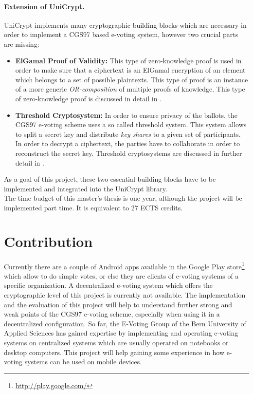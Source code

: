 \documentclass[numbers=noenddot, abstract=on, a4paper, headsepline,
footsepline, oneside, draft=off]{scrreprt}
\begin{document}
\paragraph{Extension of UniCrypt.}
UniCrypt implements many cryptographic building blocks which are necessary in
order to implement a CGS97 based e-voting system, however two crucial parts are
missing:
\begin{itemize}
  \item \textbf{ElGamal Proof of Validity:} This type of zero-knowledge proof is
  used in order to make sure that a ciphertext is an ElGamal encryption of an
  element which belongs to a set of possible plaintexts. This type of proof is
  an instance	 of a more generic \emph{OR-composition} of multiple proofs of
  knowledge. This type of zero-knowledge proof is discussed in detail in
  .
  \item \textbf{Threshold Cryptosystem:} In order to ensure privacy of
  the ballots, the CGS97 e-voting scheme uses a so called threshold system. This
  system allows to split a secret key and distribute \emph{key shares} to a
  given set of participants. In order to decrypt a ciphertext, the parties have
  to collaborate in order to reconstruct the secret key. Threshold cryptosystems
  are discussed in further detail in .
\end{itemize}

As a goal of this project, these two essential building blocks have to be
implemented and integrated into the UniCrypt library.
\\

The time budget of this master's thesis is one year, although the project will
be implemented part time. It is equivalent to 27 ECTS credits.

\section{Contribution}
\label{sec:contribution}
Currently there are a couple of Android apps available in the Google Play
store\footnote{\url{http://play.google.com/}} which allow to do simple votes, or
else they are clients of e-voting systems of a specific organization. A
decentralized e-voting system which offers the cryptographic level of this
project is currently not available. The implementation and the evaluation of
this project will help to understand further strong and weak points of the CGS97
e-voting scheme, especially when using it in a decentralized configuration. So
far, the E-Voting Group of the Bern University of Applied Sciences has gained
expertise by implementing and operating e-voting systems on centralized systems
which are usually operated on notebooks or desktop computers. This project will
help gaining some experience in how e-voting systems can be used on mobile
devices.
\end{document}
